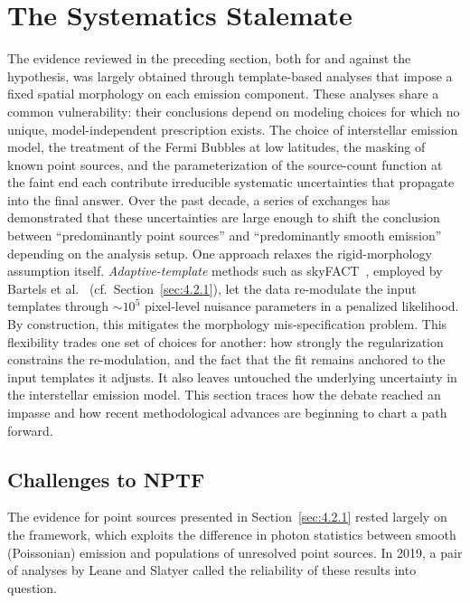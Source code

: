 
\section{The Systematics Stalemate}
\label{sec:4.3}

The evidence reviewed in the preceding section, both for and against the \MSP hypothesis, was largely obtained through template-based analyses that impose a fixed spatial morphology on each emission component.
These analyses share a common vulnerability: their conclusions depend on modeling choices for which no unique, model-independent prescription exists.
The choice of interstellar emission model, the treatment of the Fermi Bubbles at low latitudes, the masking of known point sources, and the parameterization of the source-count function at the faint end each contribute irreducible systematic uncertainties that propagate into the final answer.
Over the past decade, a series of exchanges has demonstrated that these uncertainties are large enough to shift the conclusion between ``predominantly point sources'' and ``predominantly smooth emission'' depending on the analysis setup.
One approach relaxes the rigid-morphology assumption itself.
\emph{Adaptive-template} methods such as skyFACT~\cite{Storm:2017arh}, employed by Bartels et al.~\cite{Bartels:2017vsx} (cf.\ Section~\ref{sec:4.2.1}), let the data re-modulate the input templates through $\sim 10^5$ pixel-level nuisance parameters in a penalized likelihood.
By construction, this mitigates the morphology mis-specification problem.
This flexibility trades one set of choices for another: how strongly the regularization constrains the re-modulation, and the fact that the fit remains anchored to the input templates it adjusts.
It also leaves untouched the underlying uncertainty in the interstellar emission model.
This section traces how the debate reached an impasse and how recent methodological advances are beginning to chart a path forward.

\subsection{Challenges to NPTF}
\label{sec:4.3.1}

The evidence for point sources presented in Section~\ref{sec:4.2.1} rested largely on the \NPTF framework, which exploits the difference in photon statistics between smooth (Poissonian) emission and populations of unresolved point sources.
In 2019, a pair of analyses by Leane and Slatyer called the reliability of these results into question.

